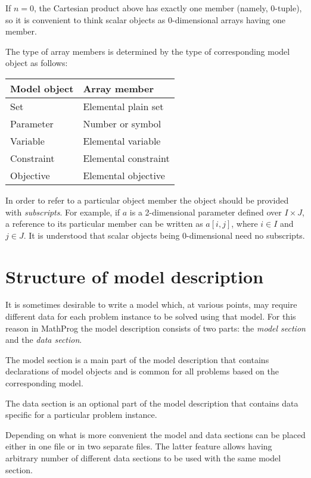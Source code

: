 \documentclass[11pt]{report}
\begin{document}
If $n=0$, the Cartesian product above has exactly one member (namely,
0-tuple), so it is convenient to think scalar objects as 0-dimensional
arrays having one member.

\newpage

The type of array members is determined by the type of corresponding
model object as follows:

\medskip

\noindent\hfil
\begin{tabular}{@{}ll@{}}
Model object&Array member\\
\hline
Set&Elemental plain set\\
Parameter&Number or symbol\\
Variable&Elemental variable\\
Constraint&Elemental constraint\\
Objective&Elemental objective\\
\end{tabular}

\medskip

In order to refer to a particular object member the object should be
provided with {\it subscripts}. For example, if $a$ is a 2-dimensional
parameter defined over $I\times J$, a reference to its particular
member can be written as $a[i,j]$, where $i\in I$ and $j\in J$. It is
understood that scalar objects being 0-dimensional need no subscripts.

\section{Structure of model description}

It is sometimes desirable to write a model which, at various points,
may require different data for each problem instance to be solved using
that model. For this reason in MathProg the model description consists
of two parts: the {\it model section} and the {\it data section}.

The model section is a main part of the model description that contains
declarations of model objects and is common for all problems based on
the corresponding model.

The data section is an optional part of the model description that
contains data specific for a particular problem instance.

Depending on what is more convenient the model and data sections can be
placed either in one file or in two separate files. The latter feature
allows having arbitrary number of different data sections to be used
with the same model section.
\end{document}
